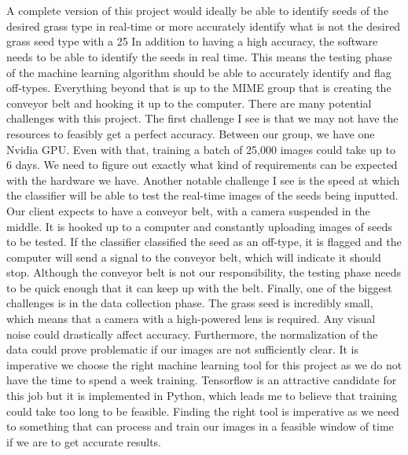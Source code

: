 \documentclass[onecolumn, draftclsnofoot,10pt, compsoc]{IEEEtran}
\begin{document}
\section{}
A complete version of this project would ideally be able to identify seeds of the desired grass type in real-time or more accurately identify what is not the desired grass seed type with a 25%
In addition to having a high accuracy, the software needs to be able to identify the seeds in real time. This means the testing phase of the machine learning algorithm should be able to accurately identify and flag off-types. Everything beyond that is up to the MIME group that is creating the conveyor belt and hooking it up to the computer.
There are many potential challenges with this project. The first challenge I see is that we may not have the resources to feasibly get a perfect accuracy. Between our group, we have one Nvidia GPU. Even with that, training a batch of 25,000 images could take up to 6 days. We need to figure out exactly what kind of requirements can be expected with the hardware we have.
Another notable challenge I see is the speed at which the classifier will be able to test the real-time images of the seeds being inputted. Our client expects to have a conveyor belt, with a camera suspended in the middle. It is hooked up to a computer and constantly uploading images of seeds to be tested. If the classifier classified the seed as an off-type, it is flagged and the computer will send a signal to the conveyor belt, which will indicate it should stop. Although the conveyor belt is not our responsibility, the testing phase needs to be quick enough that it can keep up with the belt.
Finally, one of the biggest challenges is in the data collection phase. The grass seed is incredibly small, which means that a camera with a high-powered lens is required. Any visual noise could drastically affect accuracy. Furthermore, the normalization of the data could prove problematic if our images are not sufficiently clear. It is imperative we choose the right machine learning tool for this project as we do not have the time to spend a week training. Tensorflow is an attractive candidate for this job but it is implemented in Python, which leads me to believe that training could take too long to be feasible. Finding the right tool is imperative as we need to something that can process and train our images in a feasible window of time if we are to get accurate results.
\end{document}
